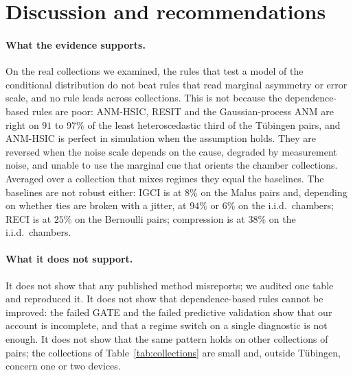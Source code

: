 \section{Discussion and recommendations}\label{sec:discussion}

\paragraph{What the evidence supports.} On the real collections we examined, the rules that test a model of the conditional distribution do not beat rules that read marginal asymmetry or error scale, and no rule leads across collections. This is not because the dependence-based rules are poor: ANM-HSIC, RESIT and the Gaussian-process ANM are right on $91$ to $97\%$ of the least heteroscedastic third of the T\"ubingen pairs, and ANM-HSIC is perfect in simulation when the assumption holds. They are reversed when the noise scale depends on the cause, degraded by measurement noise, and unable to use the marginal cue that orients the chamber collections. Averaged over a collection that mixes regimes they equal the baselines. The baselines are not robust either: IGCI is at $8\%$ on the Malus pairs and, depending on whether ties are broken with a jitter, at $94\%$ or $6\%$ on the i.i.d.\ chambers; RECI is at $25\%$ on the Bernoulli pairs; compression is at $38\%$ on the i.i.d.\ chambers.

\paragraph{What it does not support.} It does not show that any published method misreports; we audited one table and reproduced it. It does not show that dependence-based rules cannot be improved: the failed GATE and the failed predictive validation show that our account is incomplete, and that a regime switch on a single diagnostic is not enough. It does not show that the same pattern holds on other collections of pairs; the collections of Table~\ref{tab:collections} are small and, outside T\"ubingen, concern one or two devices.

